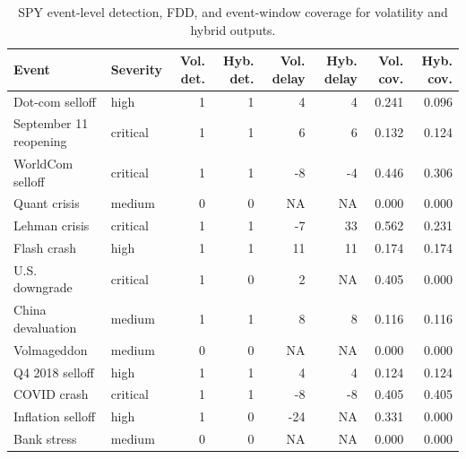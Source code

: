 \documentclass{book}
\begin{document}
\begin{table}[!tbp]
\centering
\caption{SPY event-level detection, FDD, and event-window coverage for volatility and hybrid outputs.}
\label{tab:spy_event_level}
\scriptsize
\begin{tabular}{llrrrrrr}
\toprule
Event & Severity & Vol. det. & Hyb. det. & Vol. delay & Hyb. delay & Vol. cov. & Hyb. cov.\\
\midrule
Dot-com selloff & high & 1 & 1 & 4 & 4 & 0.241 & 0.096\\
September 11 reopening & critical & 1 & 1 & 6 & 6 & 0.132 & 0.124\\
WorldCom selloff & critical & 1 & 1 & -8 & -4 & 0.446 & 0.306\\
Quant crisis & medium & 0 & 0 & NA & NA & 0.000 & 0.000\\
Lehman crisis & critical & 1 & 1 & -7 & 33 & 0.562 & 0.231\\
Flash crash & high & 1 & 1 & 11 & 11 & 0.174 & 0.174\\
U.S. downgrade & critical & 1 & 0 & 2 & NA & 0.405 & 0.000\\
China devaluation & medium & 1 & 1 & 8 & 8 & 0.116 & 0.116\\
Volmageddon & medium & 0 & 0 & NA & NA & 0.000 & 0.000\\
Q4 2018 selloff & high & 1 & 1 & 4 & 4 & 0.124 & 0.124\\
COVID crash & critical & 1 & 1 & -8 & -8 & 0.405 & 0.405\\
Inflation selloff & high & 1 & 0 & -24 & NA & 0.331 & 0.000\\
Bank stress & medium & 0 & 0 & NA & NA & 0.000 & 0.000\\
\bottomrule
\end{tabular}
\end{table}
\end{document}
